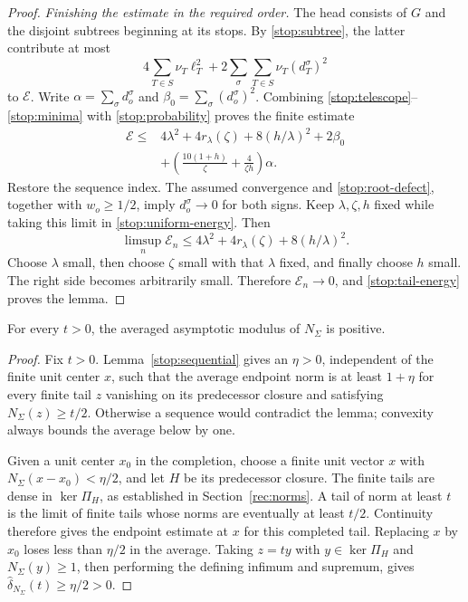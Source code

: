 \begin{proof}
\medskip
\noindent\emph{Finishing the estimate in the required order.}
The head consists of $G$ and the disjoint subtrees beginning at its
stops.  By \eqref{stop:subtree}, the latter contribute at most
\[
 4\sum_{T\in S}\nu_T\ell_T^2+
 2\sum_\sigma\sum_{T\in S}\nu_T(d_T^\sigma)^2
\]
to $\mathcal E$.  Write $\alpha=\sum_\sigma d_o^\sigma$ and
$\beta_0=\sum_\sigma(d_o^\sigma)^2$.  Combining
\eqref{stop:telescope}--\eqref{stop:minima} with
\eqref{stop:probability} proves the finite estimate
\begin{equation}\label{stop:uniform-energy}
 \begin{split}
 \mathcal E\le{}&4\lambda^2+4r_\lambda(\zeta)
                  +8(h/\lambda)^2+2\beta_0\\
 &+\left(\frac{10(1+h)}{\zeta}+\frac4{\zeta h}\right)\alpha.
 \end{split}
\end{equation}
Restore the sequence index.  The assumed convergence and
\eqref{stop:root-defect}, together with $w_o\ge1/2$, imply
$d_o^\sigma\to0$ for both signs.  Keep $\lambda,\zeta,h$ fixed
while taking this limit in \eqref{stop:uniform-energy}.  Then
\[
 \limsup_n\mathcal E_n
 \le4\lambda^2+4r_\lambda(\zeta)+8(h/\lambda)^2.
\]
Choose $\lambda$ small, then choose $\zeta$ small with that
$\lambda$ fixed, and finally choose $h$ small.  The right side becomes
arbitrarily small.  Therefore $\mathcal E_n\to0$, and
\eqref{stop:tail-energy} proves the lemma.
\end{proof}

\begin{corollary}\label{stop:all-radii}
For every $t>0$, the averaged asymptotic modulus of $N_\Sigma$ is positive.
\end{corollary}

\begin{proof}
Fix $t>0$.  Lemma~\ref{stop:sequential} gives an $\eta>0$, independent
of the finite unit center $x$, such that the average endpoint norm is
at least $1+\eta$ for every finite tail $z$ vanishing on its predecessor
closure and satisfying $N_\Sigma(z)\ge t/2$.  Otherwise a sequence
would contradict the lemma; convexity always bounds the average below
by one.

Given a unit center $x_0$ in the completion, choose a finite unit vector
$x$ with $N_\Sigma(x-x_0)<\eta/2$, and let $H$ be its predecessor
closure.  The finite tails are dense in $\ker\Pi_H$, as established in
Section~\ref{rec:norms}.  A tail of norm at least $t$ is the limit of
finite tails whose norms are eventually at least $t/2$.  Continuity
therefore gives the endpoint estimate at $x$ for this completed tail.
Replacing $x$ by $x_0$ loses less than $\eta/2$ in the average.
Taking $z=ty$ with $y\in\ker\Pi_H$ and $N_\Sigma(y)\ge1$, then
performing the defining infimum and supremum, gives
$\widehat\delta_{N_\Sigma}(t)\ge\eta/2>0$.
\end{proof}

